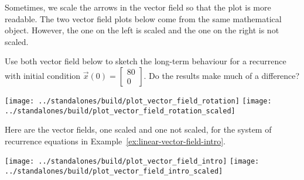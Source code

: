 \documentclass[../main.tex]{subfiles}
\begin{document}
\begin{example}
  Sometimes, we scale the arrows in the vector field so that the plot is more readable. The two vector field plots below come from the same mathematical object. However, the one on the left is scaled and the one on the right is not scaled. 

  Use both vector field below to sketch the long-term behaviour for a recurrence with initial condition \(\vec{x}(0) = \begin{bmatrix} 80 \\ 0 \end{bmatrix}\). Do the results make much of a difference?

  \begin{center}
    \texttt{[image: ../standalones/build/plot\_vector\_field\_rotation]}
    \quad
    \texttt{[image: ../standalones/build/plot\_vector\_field\_rotation\_scaled]}
  \end{center}
\end{example}
\vfill{}

\clearpage
\begin{example}
  Here are the vector fields, one scaled and one not scaled, for the system of recurrence equations in Example~\ref{ex:linear-vector-field-intro}.

  \begin{center}
    \texttt{[image: ../standalones/build/plot\_vector\_field\_intro]}
    \quad
    \texttt{[image: ../standalones/build/plot\_vector\_field\_intro\_scaled]}
  \end{center}
\end{example}
\end{document}
